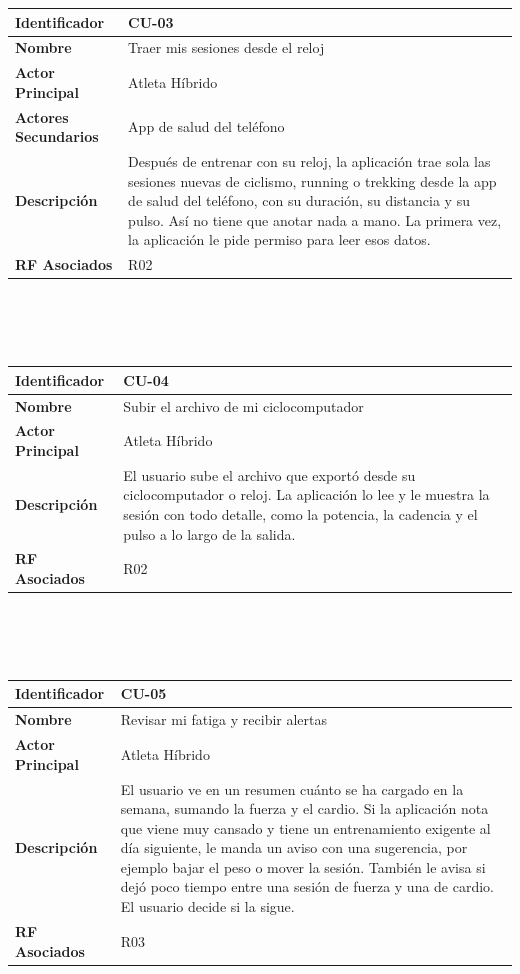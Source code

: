\newpage
\begin{tabular}{|p{3.5cm}|p{11.5cm}|}
    \hline
    \rowcolor[HTML]{EFEFEF}
    \textbf{Identificador} & \textbf{CU-03} \\ \hline
    \textbf{Nombre} & Traer mis sesiones desde el reloj \\ \hline
    \textbf{Actor Principal} & Atleta Híbrido \\ \hline
    \textbf{Actores Secundarios} & App de salud del teléfono \\ \hline
    \textbf{Descripción} & Después de entrenar con su reloj, la aplicación trae sola las sesiones nuevas de ciclismo, running o trekking desde la app de salud del teléfono, con su duración, su distancia y su pulso. Así no tiene que anotar nada a mano. La primera vez, la aplicación le pide permiso para leer esos datos. \\ \hline
    \textbf{RF Asociados} & R02 \\ \hline
\end{tabular}
\\\\\\
\begin{tabular}{|p{3.5cm}|p{11.5cm}|}
    \hline
    \rowcolor[HTML]{EFEFEF}
    \textbf{Identificador} & \textbf{CU-04} \\ \hline
    \textbf{Nombre} & Subir el archivo de mi ciclocomputador \\ \hline
    \textbf{Actor Principal} & Atleta Híbrido \\ \hline
    \textbf{Descripción} & El usuario sube el archivo que exportó desde su ciclocomputador o reloj. La aplicación lo lee y le muestra la sesión con todo detalle, como la potencia, la cadencia y el pulso a lo largo de la salida. \\ \hline
    \textbf{RF Asociados} & R02 \\ \hline
\end{tabular}
\\\\\\
\begin{tabular}{|p{3.5cm}|p{11.5cm}|}
    \hline
    \rowcolor[HTML]{EFEFEF}
    \textbf{Identificador} & \textbf{CU-05} \\ \hline
    \textbf{Nombre} & Revisar mi fatiga y recibir alertas \\ \hline
    \textbf{Actor Principal} & Atleta Híbrido \\ \hline
    \textbf{Descripción} & El usuario ve en un resumen cuánto se ha cargado en la semana, sumando la fuerza y el cardio. Si la aplicación nota que viene muy cansado y tiene un entrenamiento exigente al día siguiente, le manda un aviso con una sugerencia, por ejemplo bajar el peso o mover la sesión. También le avisa si dejó poco tiempo entre una sesión de fuerza y una de cardio. El usuario decide si la sigue. \\ \hline
    \textbf{RF Asociados} & R03 \\ \hline
\end{tabular}
